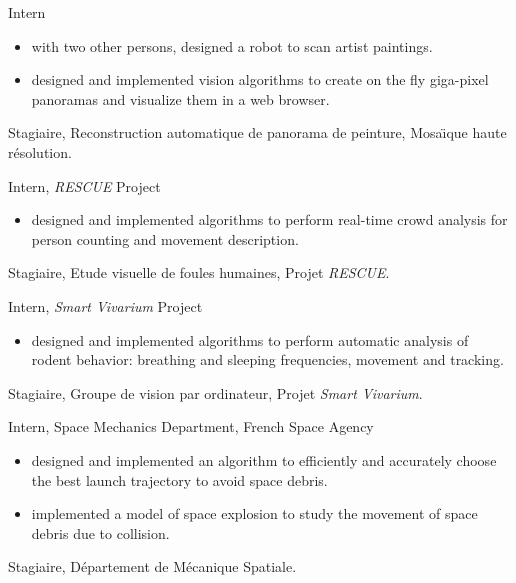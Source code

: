 \documentclass{article}
\begin{document}
\begin{llist}
{
Intern
\vspace{-0.33cm}
\begin{itemize}
 \item with two other persons, designed a robot to scan artist paintings.
 \item designed and implemented vision algorithms to create on the fly giga-pixel panoramas and visualize them in a web 
browser.
\end{itemize}
}
{
Stagiaire, Reconstruction automatique de panorama de peinture, Mosa\"{\i}que haute r\'{e}solution.
}

{
Intern, {\em RESCUE} Project
\vspace{-0.33cm}
\begin{itemize}
 \item designed and implemented algorithms to perform real-time crowd analysis for person counting and movement 
description.
\end{itemize}
}
{
Stagiaire, Etude visuelle de foules humaines, Projet {\em RESCUE}.
}

{
Intern, {\em Smart Vivarium} Project
\vspace{-0.33cm}
\begin{itemize}
 \item designed and implemented algorithms to perform automatic analysis of rodent behavior: breathing and sleeping 
frequencies, movement and tracking.
\end{itemize}
}
{
Stagiaire, Groupe de vision par ordinateur, Projet {\em Smart Vivarium}.
}

{
Intern, Space Mechanics Department, French Space Agency
\vspace{-0.33cm}
\begin{itemize}
 \item designed and implemented an algorithm to efficiently and accurately choose the best launch trajectory 
to avoid space debris.
 \item implemented a model of space explosion to study the movement of space debris due to collision.
\end{itemize}
}
{
Stagiaire, D\'{e}partement de M\'{e}canique Spatiale.
}


\end{llist}
\end{document}

